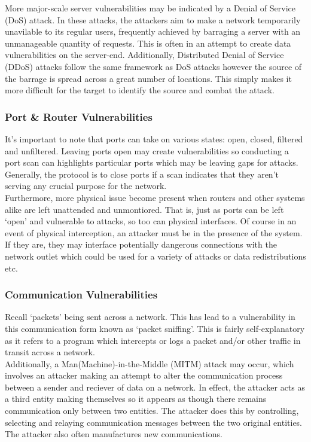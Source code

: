 \documentclass[11pt, english]{article}
\begin{document}
	More major-scale server vulnerabilities may be indicated by a Denial of Service (DoS) attack. In these attacks, the attackers aim to make a network temporarily unavilable to its regular users, frequently achieved by barraging a server with an unmanageable quantity of requests. This is often in an attempt to create data vulnerabilities on the server-end. Additionally, Distributed Denial of Service (DDoS) attacks follow the same framework as DoS attacks however the source of the barrage is spread across a great number of locations. This simply makes it more difficult for the target to identify the source and combat the attack.

		\subsubsection{Port \& Router Vulnerabilities}

	It's important to note that ports can take on various states: open, closed, filtered and unfiltered. Leaving ports open may create vulnerabilities so conducting a port scan can highlights particular ports which may be leaving gaps for attacks. Generally, the protocol is to close ports if a scan indicates that they aren't serving any crucial purpose for the network.\\

	Furthermore, more physical issue become present when routers and other systems alike are left unattended and unmontiored. That is, just as ports can be left `open' and vulnerable to attacks, so too can physical interfaces. Of course in an event of physical interception, an attacker must be in the presence of the system. If they are, they may interface potentially dangerous connections with the network outlet which could be used for a variety of attacks or data redistributions etc.

		\subsubsection{Communication Vulnerabilities}

	Recall `packets' being sent across a network. This has lead to a vulnerability in this communication form known as `packet sniffing'. This is fairly self-explanatory as it refers to a program which intercepts or logs a packet and/or other traffic in transit across a network.\\

	Additionally, a Man(Machine)-in-the-Middle (MITM) attack may occur, which involves an attacker making an attempt to alter the communication process between a sender and reciever of data on a network. In effect, the attacker acts as a third entity making themselves so it appears as though there remains communication only between two entities. The attacker does this by controlling, selecting and relaying communication messages between the two original entities. The attacker also often manufactures new communications.\\
\end{document}
